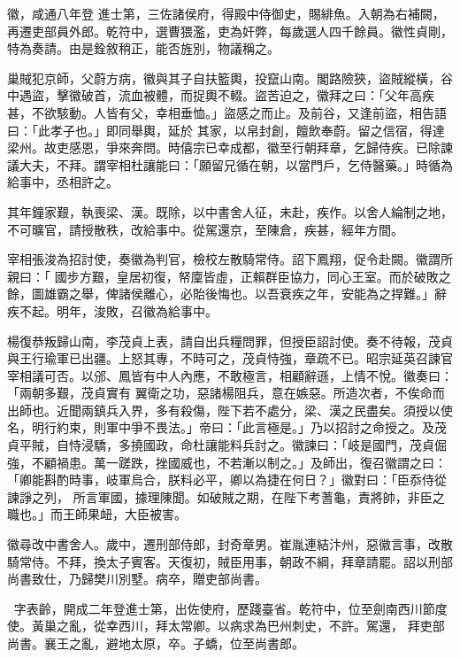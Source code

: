 \begin{pinyinscope}
 徽，咸通八年登
 進士第，三佐諸侯府，得殿中侍御史，賜緋魚。入朝為右補闕，再遷吏部員外郎。乾符中，選曹猥濫，吏為奸弊，每歲選人四千餘員。徽性貞剛，特為奏請。由是銓敘稍正，能否旌別，物議稱之。



 巢賊犯京師，父蔚方病，徽與其子自扶籃輿，投竄山南。閣路險狹，盜賊縱橫，谷中遇盜，擊徽破首，流血被體，而捉輿不輟。盜苦迫之，徽拜之曰：「父年高疾甚，不欲駭動。人皆有父，幸相垂恤。」盜感之而止。及前谷，又逢前盜，相告語曰：「此孝子也。」即同舉輿，延於
 其家，以帛封創，饘飲奉蔚。留之信宿，得達梁州。故吏感恩，爭來奔問。時僖宗已幸成都，徽至行朝拜章，乞歸侍疾。已除諫議大夫，不拜。謂宰相杜讓能曰：「願留兄循在朝，以當門戶，乞侍醫藥。」時循為給事中，丞相許之。



 其年鐘家艱，執喪梁、漢。既除，以中書舍人征，未赴，疾作。以舍人綸制之地，不可曠官，請授散秩，改給事中。從駕還京，至陳倉，疾甚，經年方間。



 宰相張浚為招討使，奏徽為判官，檢校左散騎常侍。詔下鳳翔，促令赴闕。徽謂所親曰：「
 國步方艱，皇居初復，帑廩皆虛，正賴群臣協力，同心王室。而於破敗之餘，圖雄霸之舉，俾諸侯離心，必貽後悔也。以吾衰疾之年，安能為之捍難。」辭疾不起。明年，浚敗，召徽為給事中。



 楊復恭叛歸山南，李茂貞上表，請自出兵糧問罪，但授臣詔討使。奏不待報，茂貞與王行瑜軍已出疆。上怒其專，不時可之，茂貞恃強，章疏不已。昭宗延英召諫官宰相議可否。以邠、鳳皆有中人內應，不敢極言，相顧辭遜，上情不悅。徽奏曰：「兩朝多艱，茂貞實有
 翼衛之功，惡諸楊阻兵，意在嫉惡。所造次者，不俟命而出師也。近聞兩鎮兵入界，多有殺傷，陛下若不處分，梁、漢之民盡矣。須授以使名，明行約束，則軍中爭不畏法。」帝曰：「此言極是。」乃以招討之命授之。及茂貞平賊，自恃浸驕，多撓國政，命杜讓能料兵討之。徽諫曰：「岐是國門，茂貞倔強，不顧禍患。萬一蹉跌，挫國威也，不若漸以制之。」及師出，復召徽謂之曰：「卿能斟酌時事，岐軍烏合，朕料必平，卿以為捷在何日？」徽對曰：「臣忝侍從諫諍之列，
 所言軍國，據理陳聞。如破賊之期，在陛下考蓍龜，責將帥，非臣之職也。」而王師果衄，大臣被害。



 徽尋改中書舍人。歲中，遷刑部侍郎，封奇章男。崔胤連結汴州，惡徽言事，改散騎常侍。不拜，換太子賓客。天復初，賊臣用事，朝政不綱，拜章請罷。詔以刑部尚書致仕，乃歸樊川別墅。病卒，贈吏部尚書。



 ，字表齡，開成二年登進士第，出佐使府，歷踐臺省。乾符中，位至劍南西川節度使。黃巢之亂，從幸西川，拜太常卿。以病求為巴州刺史，不許。駕還，
 拜吏部尚書。襄王之亂，避地太原，卒。子蟜，位至尚書郎。




\end{pinyinscope}

